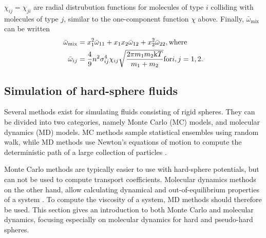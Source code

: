 $\chi_{ij} = \chi_{ji}$ are radial distrubution functions for molecules 
of type $i$ colliding with molecules of type $j$, 
similar to the one-component function $\chi$ above.
Finally, $\bar{\omega}_{\text{mix}}$ can be written
\begin{equation}
    \begin{split}
        \bar{\omega}_{\text{mix}} 
            &= x_1^2 \bar{\omega}_{11} 
            + x_1 x_2 \bar{\omega}_{12} 
            + x_2^2 \bar{\omega}_{22}, \text{where}\\
        \bar{\omega}_{ij} 
            &= \frac{4}{9} n^2 \sigma_{ij}^4 \chi_{ij} 
            \sqrt{\frac{2\pi m_1 m_2 \mathrm{k} T}{m_1 + m_2}} 
            \text{for} i,j = 1,2.
    \end{split}
\end{equation}



\subsection{Simulation of hard-sphere fluids}
Several methods exist for simulating fluids consisting of rigid spheres.
They can be divided into two categories, namely Monte Carlo (MC) models,
and molecular dynamics (MD) models.
MC methods sample statistical ensembles using random walk,  %
while MD methods use Newton's equations of motion to compute the deterministic
path of a large collection of particles \cite{ref:allen:MD_sim}.

Monte Carlo methods are typically easier to use with hard-sphere potentials,
but can not be used to compute transport coefficients. 
Molecular dynamics methods on the other hand, allow calculating dynamical 
and out-of-equilibrium properties of a system \cite{ref:allen:MD_sim}.
To compute the viscosity of a system, MD methods should therefore be used.
This section gives an introduction to both Monte Carlo and molecular dynamics,
focusing especially on molecular dynamics for hard and pseudo-hard spheres.

